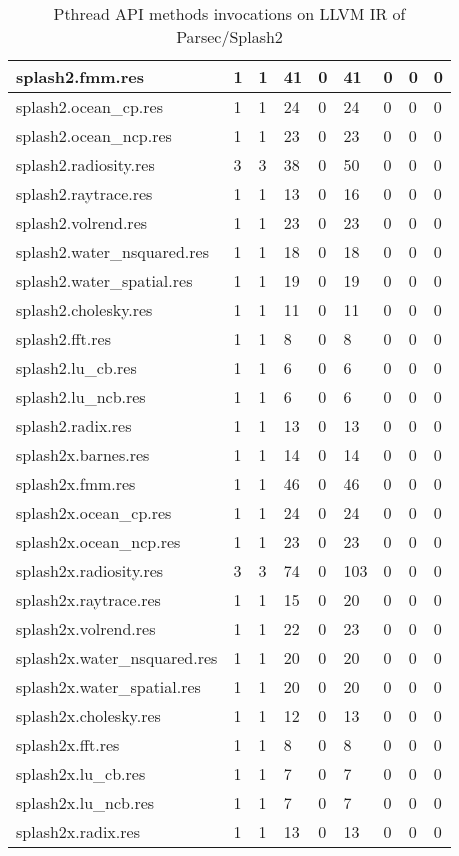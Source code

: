 \begin{table}[!h]
{\begin{tabular}{|l|l|l|l|l|l|l|l|l|}
splash2.fmm.res &  1 &  1 &  41 &  0 &  41 &  0 &  0 &  0 \\ \hline 
splash2.ocean\_cp.res &  1 &  1 &  24 &  0 &  24 &  0 &  0 &  0 \\ \hline
splash2.ocean\_ncp.res &  1 &  1 &  23 &  0 &  23 &  0 &  0 &  0 \\ \hline
splash2.radiosity.res &  3 &  3 &  38 &  0 &  50 &  0 &  0 &  0 \\ \hline
splash2.raytrace.res &  1 &  1 &  13 &  0 &  16 &  0 &  0 &  0 \\ \hline 
splash2.volrend.res &  1 &  1 &  23 &  0 &  23 &  0 &  0 &  0 \\ \hline
splash2.water\_nsquared.res &  1 &  1 &  18 &  0 &  18 &  0 &  0 &  0 \\ \hline
splash2.water\_spatial.res &  1 &  1 &  19 &  0 &  19 &  0 &  0 &  0 \\ \hline
splash2.cholesky.res &  1 &  1 &  11 &  0 &  11 &  0 &  0 &  0 \\ \hline
splash2.fft.res &  1 &  1 &  8 &  0 &  8 &  0 &  0 &  0 \\ \hline 
splash2.lu\_cb.res &  1 &  1 &  6 &  0 &  6 &  0 &  0 &  0 \\ \hline
splash2.lu\_ncb.res &  1 &  1 &  6 &  0 &  6 &  0 &  0 &  0 \\ \hline 
splash2.radix.res &  1 &  1 &  13 &  0 &  13 &  0 &  0 &  0 \\ \hline
splash2x.barnes.res &  1 &  1 &  14 &  0 &  14 &  0 &  0 &  0 \\ \hline
splash2x.fmm.res &  1 &  1 &  46 &  0 &  46 &  0 &  0 &  0 \\ \hline
splash2x.ocean\_cp.res &  1 &  1 &  24 &  0 &  24 &  0 &  0 &  0 \\ \hline
splash2x.ocean\_ncp.res &  1 &  1 &  23 &  0 &  23 &  0 &  0 &  0 \\ \hline
splash2x.radiosity.res &  3 &  3 &  74 &  0 &  103 &  0 &  0 &  0 \\ \hline
splash2x.raytrace.res &  1 &  1 &  15 &  0 &  20 &  0 &  0 &  0 \\ \hline
splash2x.volrend.res &  1 &  1 &  22 &  0 &  23 &  0 &  0 &  0 \\ \hline
splash2x.water\_nsquared.res &  1 &  1 &  20 &  0 &  20 &  0 &  0 &  0 \\ \hline
splash2x.water\_spatial.res &  1 &  1 &  20 &  0 &  20 &  0 &  0 &  0 \\ \hline
splash2x.cholesky.res &  1 &  1 &  12 &  0 &  13 &  0 &  0 &  0 \\ \hline
splash2x.fft.res &  1 &  1 &  8 &  0 &  8 &  0 &  0 &  0 \\ \hline
splash2x.lu\_cb.res &  1 &  1 &  7 &  0 &  7 &  0 &  0 &  0 \\ \hline
splash2x.lu\_ncb.res &  1 &  1 &  7 &  0 &  7 &  0 &  0 &  0 \\ \hline
splash2x.radix.res &  1 &  1 &  13 &  0 &  13 &  0 &  0 &  0 \\ \hline
\end{tabular}
}
\caption{Pthread API methods invocations on LLVM IR of Parsec/Splash2}
\end{table}



